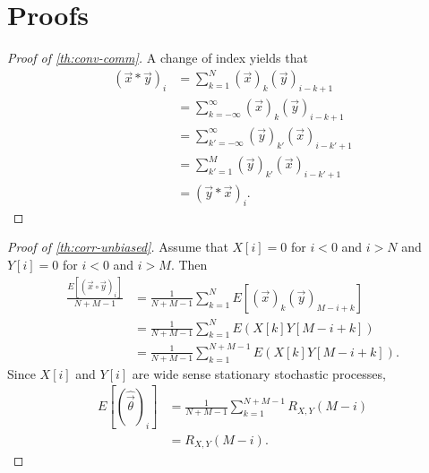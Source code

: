 \documentclass[a4paper, openany, oneside]{memoir}
\begin{document}
\chapter{Proofs}
\begin{proof}[Proof of \cref{th:conv-comm}]
    A change of index yields that
    \begin{align*}
        (\vec{x} \ast \vec{y})_i &= \sum_{k=1}^{N} (\vec{x})_k (\vec{y})_{i-k+1} \\
        &= \sum_{k=-\infty}^{\infty} (\vec{x})_k (\vec{y})_{i-k+1} \\
        &= \sum_{k'=-\infty}^{\infty} (\vec{y})_{k'} (\vec{x})_{i-k'+1} \\
        &= \sum_{k'=1}^{M} (\vec{y})_{k'} (\vec{x})_{i-k'+1} \\
        &= (\vec{y} \ast \vec{x})_i.
    \end{align*}
\end{proof}
\begin{proof}[Proof of \cref{th:corr-unbiased}]
    Assume that $X[i] = 0$ for $i < 0$ and $i > N$ and $Y[i] = 0$ for $i < 0$ and $i > M$. Then
    \begin{align*}
        \frac{E[(\vec{x} \circ \vec{y})_i]}{N+M-1} &= \frac{1}{N+M-1} \sum_{k=1}^N E[(\vec{x})_k (\vec{y})_{M-i+k}] \\
        &= \frac{1}{N+M-1} \sum_{k=1}^N E(X[k] Y[M-i+k]) \\
        &= \frac{1}{N+M-1} \sum_{k=1}^{N+M-1} E(X[k] Y[M-i+k]).
    \end{align*}
    Since $X[i]$ and $Y[i]$ are wide sense stationary stochastic processes,
    \begin{align*}
        E[(\hat{\vec{\theta}})_i] &= \frac{1}{N+M-1} \sum_{k=1}^{N+M-1} R_{X,Y}(M-i) \\
        &= R_{X,Y}(M-i).
    \end{align*}
\end{proof}
\end{document}
